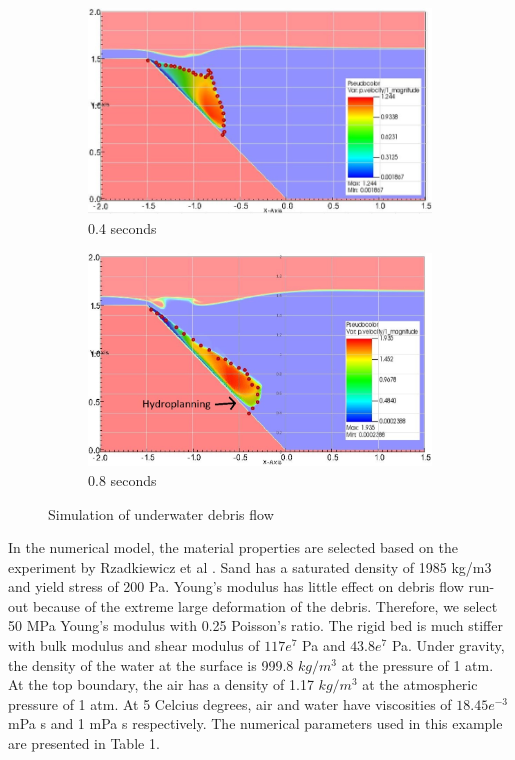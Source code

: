 \documentclass[preprint,12pt]{elsarticle}
\begin{document}
\begin{figure}[h]
\center
\begin{subfigure}[c]{0.5\linewidth}
\includegraphics[width=\linewidth]{1.jpg}
\caption{0.4 seconds}
\label{0.4s}
\end{subfigure}\hfill    
\begin{subfigure}[d]{0.5\linewidth}
\includegraphics[width=\linewidth]{2.jpg}
\caption{0.8 seconds}
\label{0.8s}
\end{subfigure}
\caption{Simulation of underwater debris flow}
\label{fig:debris}
\end{figure}
%
%
In the numerical model, the material properties are selected based on the experiment by Rzadkiewicz et al \cite{Rzadkiewicz}. Sand has a saturated density of 1985 kg/m3 and yield stress of 200 Pa. Young's modulus has little effect on debris flow run-out because of the extreme large deformation of the debris. Therefore, we select 50 MPa Young's modulus with 0.25 Poisson's ratio. The rigid bed is much stiffer with bulk modulus and shear modulus of $117e^7$ Pa and $43.8e^7$ Pa. Under gravity, the density of the water at the surface is 999.8 $kg/m^3$ at the pressure of 1 atm. At the top boundary, the air has a density of 1.17 $kg/m^3$ at the atmospheric pressure of 1 atm. At 5 Celcius degrees, air and water have viscosities of $18.45e^{-3}$  mPa s and 1  mPa s respectively. The numerical parameters used in this example are presented in Table 1.   \\
\end{document}
